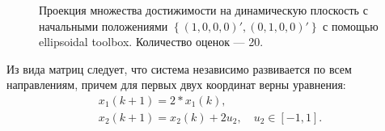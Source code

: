 \documentclass[10pt, a4paper]{article}
\begin{document}
\begin{figure}[H]
\caption{Проекция множества достижимости на динамическую плоскость с начальными положениями $\left\{(1,0,0,0)',(0,1,0,0)'\right\}$ с помощью ellipsoidal toolbox. Количество оценок --- 20.}
\end{figure}

Из вида матриц следует, что система независимо развивается по всем направлениям, причем для первых двух координат верны уравнения:
\begin{gather*}
x_1(k+1) = 2*x_1(k),\\
x_2(k+1) = x_2(k)+2u_2,\quad u_2 \in[-1,1].
\end{gather*}
\end{document}
